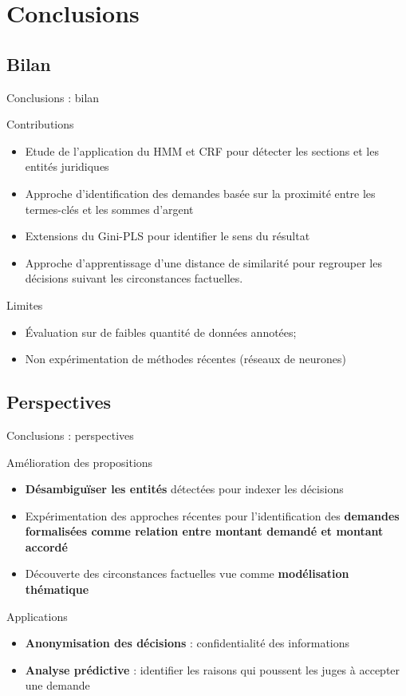 \section{Conclusions}
\subsection{Bilan}
\begin{frame}[c]{Conclusions : bilan}
	\small
\begin{block}{Contributions}
	\begin{itemize}
		\item Etude de l'application du HMM  et CRF pour détecter les sections et les entités juridiques
		\item Approche d'identification des demandes basée sur la proximité entre les termes-clés et les sommes d'argent		
		\item Extensions du Gini-PLS pour identifier le sens du résultat
		\item Approche d'apprentissage d'une distance de similarité pour regrouper les décisions suivant les circonstances factuelles.
	\end{itemize}
\end{block}
\begin{alertblock}{Limites}
	\begin{itemize}
		\item Évaluation sur de faibles quantité de données annotées;
		\item Non expérimentation de méthodes récentes (réseaux de neurones)
	\end{itemize}
\end{alertblock}
\end{frame}

\subsection{Perspectives}
\begin{frame}[c]{Conclusions : perspectives}
	\small
	\begin{block}{Amélioration des propositions}
		\begin{itemize}
			\item \textbf{Désambiguïser les entités} détectées pour indexer les décisions
			\item Expérimentation des approches récentes pour l'identification des \textbf{demandes formalisées comme relation entre montant demandé et montant accordé}
			\item Découverte des circonstances factuelles vue comme \textbf{modélisation thématique}
		\end{itemize}
	\end{block}
	\begin{block}{Applications}
		\begin{itemize}
			\item \textbf{Anonymisation des décisions} : confidentialité des informations
			\item \textbf{Analyse prédictive} : identifier les raisons qui poussent les juges à accepter une demande
		\end{itemize}
	\end{block}
\end{frame}